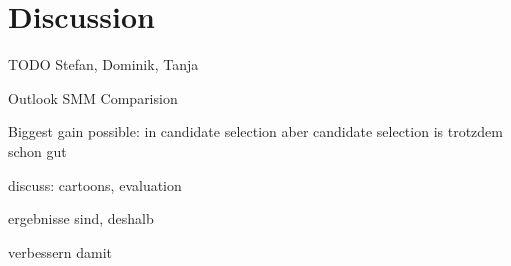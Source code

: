 \section{Discussion}
\label{sec_discussion}

TODO Stefan, Dominik, Tanja

Outlook SMM Comparision

Biggest gain possible: in candidate selection
aber candidate selection is trotzdem schon gut

discuss: cartoons, evaluation

ergebnisse sind, deshalb

verbessern damit

